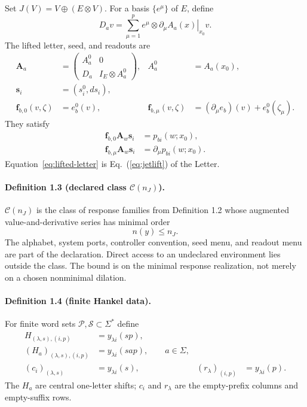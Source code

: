 \documentclass[aps,prl,reprint,superscriptaddress,nofootinbib]{revtex4-2}
\newcommand{\cP}{\mathcal P}
\newcommand{\cS}{\mathcal S}
\newcommand{\cC}{\mathcal C}
\begin{document}
Set $J(V)=V\oplus(E\otimes V)$.  For a basis $\{e^\mu\}$ of $E$, define
\begin{equation}
 D_av=\sum_{\mu=1}^p e^\mu\otimes
 \left.\partial_\mu A_a(x)\right|_{x_0}v.
 \label{eq:Da}
\end{equation}
The lifted letter, seed, and readouts are
\begin{align}
 \bm A_a&=
 \begin{pmatrix}
 A_a^0&0\\D_a&I_E\otimes A_a^0
 \end{pmatrix},
 &A_a^0&=A_a(x_0),
 \label{eq:lifted-letter}\\
 \bm s_i&=(s_i^0,ds_i),
 \label{eq:lifted-seed}\\
 \bm f_{b,0}(v,\zeta)&=e_b^0(v),
 &\bm f_{b,\mu}(v,\zeta)&=(\partial_\mu e_b)(v)+e_b^0(\zeta_\mu).
 \label{eq:lifted-readout}
\end{align}
They satisfy
\begin{align}
 \bm f_{b,0}\bm A_w\bm s_i&=p_{bi}(w;x_0),\nonumber\\
 \bm f_{b,\mu}\bm A_w\bm s_i&=\partial_\mu p_{bi}(w;x_0).
 \label{eq:jet-output}
\end{align}
Equation~\eqref{eq:lifted-letter} is Eq.~(\ref{eq:jetlift}) of the Letter.

\paragraph{Definition 1.3 (declared class $\cC(n_J)$).}
$\cC(n_J)$ is the class of response families from Definition 1.2 whose augmented value-and-derivative series has minimal order
\begin{equation}
 n(y)\le n_J.
 \label{eq:class-order}
\end{equation}
The alphabet, system ports, controller convention, seed menu, and readout menu are part of the declaration.  Direct access to an undeclared environment lies outside the class.  The bound is on the minimal response realization, not merely on a chosen nonminimal dilation.

\paragraph{Definition 1.4 (finite Hankel data).}
For finite word sets $\cP,\cS\subset\Sigma^*$ define
\begin{align}
 H_{(\lambda,s),(i,p)}&=y_{\lambda i}(sp),\label{eq:Hdef}\\
 (H_a)_{(\lambda,s),(i,p)}&=y_{\lambda i}(sap),
 \qquad a\in\Sigma,\label{eq:Hadef}\\
 (c_i)_{(\lambda,s)}&=y_{\lambda i}(s),
 & (r_\lambda)_{(i,p)}&=y_{\lambda i}(p).
 \label{eq:boundarydef}
\end{align}
The $H_a$ are central one-letter shifts; $c_i$ and $r_\lambda$ are the empty-prefix columns and empty-suffix rows.
\end{document}
